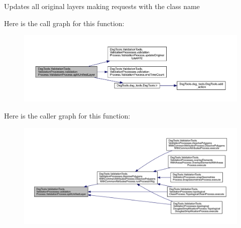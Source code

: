 \begin{DoxyVerb}Updates all original layers making requests with the class name
\end{DoxyVerb}
 Here is the call graph for this function\+:
\nopagebreak
\begin{figure}[H]
\begin{center}
\leavevmode
\includegraphics[width=350pt]{class_dsg_tools_1_1_validation_tools_1_1_validation_processes_1_1validation_process_1_1_validation_process_aaf8851c2d2aac583b16393cff399ea27_cgraph}
\end{center}
\end{figure}
Here is the caller graph for this function\+:
\nopagebreak
\begin{figure}[H]
\begin{center}
\leavevmode
\includegraphics[width=350pt]{class_dsg_tools_1_1_validation_tools_1_1_validation_processes_1_1validation_process_1_1_validation_process_aaf8851c2d2aac583b16393cff399ea27_icgraph}
\end{center}
\end{figure}
\mbox{\label{class_dsg_tools_1_1_validation_tools_1_1_validation_processes_1_1validation_process_1_1_validation_process_a22e152437a5ec56199f606139b5194dd}} 
